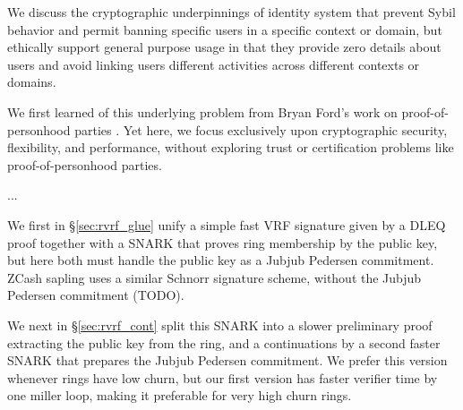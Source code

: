 
We discuss the cryptographic underpinnings of identity system that prevent Sybil behavior and permit banning specific users in a specific context or domain, but ethically support general purpose usage in that they provide zero details about users and avoid linking users different activities across different contexts or domains.   

We first learned of this underlying problem from Bryan Ford's work on proof-of-personhood parties \cite{pop2008,pop2017}.
Yet here, we focus exclusively upon cryptographic security, flexibility, and performance, without exploring trust or certification problems like proof-of-personhood parties. 



...




We first in \S\ref{sec:rvrf_glue} unify a simple fast VRF signature given by a DLEQ proof together with a SNARK that proves ring membership by the public key, but here both must handle the public key as a Jubjub Pedersen commitment.  ZCash sapling uses a similar Schnorr signature scheme, without the Jubjub Pedersen commitment (TODO). 

We next in \S\ref{sec:rvrf_cont} split this SNARK into a slower preliminary proof extracting the public key from the ring, and a continuations by a second faster SNARK that prepares the Jubjub Pedersen commitment.  We prefer this version whenever rings have low churn, but our first version has faster verifier time by one miller loop, making it preferable for very high churn rings.




\endinput

We first in \S\ref{sec:rvrf_dleq} unify a simple fast VRF signature given by a DLEQ proof together with a SNARK that proves ring membership by the public key, but here both must handle the public key as a Jubjub Pedersen commitment.  ZCash sapling uses a similar Schnorr signature scheme, without the Jubjub Pedersen commitment (TODO). 

We next in \S\ref{sec:rvrf_two_snarks} split this SNARK into a slower preliminary proof extracting the public key from the ring, and a continuations by a second faster SNARK that prepares the Jubjub Pedersen commitment.  We prefer this version whenever rings have low churn, but our first version has faster verifier time by one miller loop, making it preferable for very high churn rings.




Also, zero-knowlede continuations wind up so much faster than bruit force techniques like recursion. 

